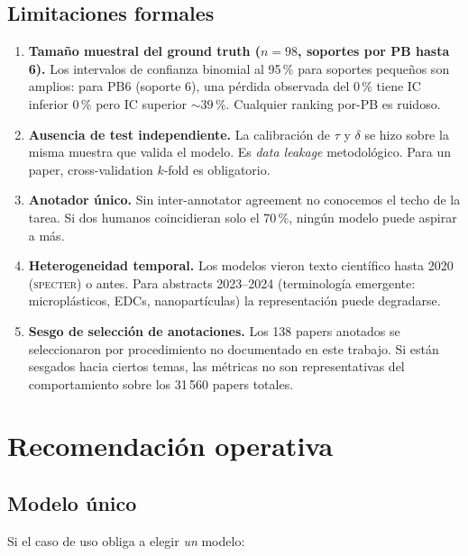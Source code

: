\documentclass[11pt,a4paper]{article}
\begin{document}
\subsection{Limitaciones formales}

\begin{enumerate}
\item \textbf{Tamaño muestral del ground truth ($n=98$, soportes por PB hasta 6).} Los intervalos de confianza binomial al 95\,\% para soportes pequeños son amplios: para PB6 (soporte 6), una pérdida observada del 0\,\% tiene IC inferior 0\,\% pero IC superior $\sim 39\,\%$. Cualquier ranking por-PB es ruidoso.
\item \textbf{Ausencia de test independiente.} La calibración de $\tau$ y $\delta$ se hizo sobre la misma muestra que valida el modelo. Es \emph{data leakage} metodológico. Para un paper, cross-validation $k$-fold es obligatorio.
\item \textbf{Anotador único.} Sin inter-annotator agreement no conocemos el techo de la tarea. Si dos humanos coincidieran solo el 70\,\%, ningún modelo puede aspirar a más.
\item \textbf{Heterogeneidad temporal.} Los modelos vieron texto científico hasta 2020 (\textsc{specter}) o antes. Para abstracts 2023--2024 (terminología emergente: microplásticos, EDCs, nanopartículas) la representación puede degradarse.
\item \textbf{Sesgo de selección de anotaciones.} Los 138 papers anotados se seleccionaron por procedimiento no documentado en este trabajo. Si están sesgados hacia ciertos temas, las métricas no son representativas del comportamiento sobre los 31\,560 papers totales.
\end{enumerate}

\section{Recomendación operativa}\label{sec:operativa}

\subsection{Modelo único}

Si el caso de uso obliga a elegir \emph{un} modelo:
\end{document}
